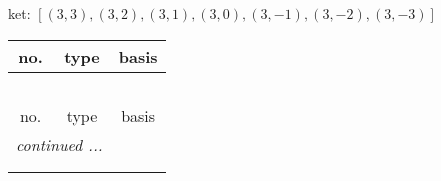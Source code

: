 \documentclass[fleqn,8pt,landscape]{jsarticle}
\begin{document}
\noindent
ket: $[(3,3),(3,2),(3,1),(3,0),(3,-1),(3,-2),(3,-3)]$
\begin{center}
\renewcommand{\arraystretch}{1.6}
\begin{longtable}{ccc}
 \hline \hline
no. & type & basis \\ \hline \endfirsthead

\multicolumn{2}{l}{\tablename\ \thetable{}} \\
 \hline \hline
no. & type & basis \\ \hline \endhead

 \hline \hline
\multicolumn{2}{r}{\footnotesize\it continued ...} \\ \endfoot

 \hline \hline
\multicolumn{2}{r}{} \\ \endlastfoot


\end{longtable}
\end{center}
\end{document}
